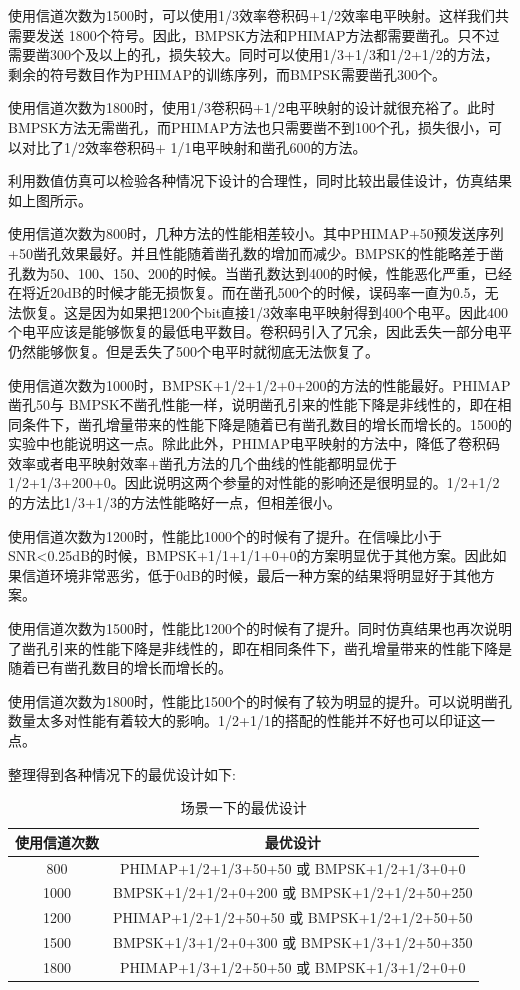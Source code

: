 使用信道次数为1500时，可以使用1/3效率卷积码+1/2效率电平映射。这样我们共需要发送 1800个符号。因此，BMPSK方法和PHIMAP方法都需要凿孔。只不过需要凿300个及以上的孔，损失较大。同时可以使用1/3+1/3和1/2+1/2的方法，剩余的符号数目作为PHIMAP的训练序列，而BMPSK需要凿孔300个。

使用信道次数为1800时，使用1/3卷积码+1/2电平映射的设计就很充裕了。此时BMPSK方法无需凿孔，而PHIMAP方法也只需要凿不到100个孔，损失很小，可以对比了1/2效率卷积码+ 1/1电平映射和凿孔600的方法。

利用数值仿真可以检验各种情况下设计的合理性，同时比较出最佳设计，仿真结果如上图所示。

使用信道次数为800时，几种方法的性能相差较小。其中PHIMAP+50预发送序列+50凿孔效果最好。并且性能随着凿孔数的增加而减少。BMPSK的性能略差于凿孔数为50、100、150、200的时候。当凿孔数达到400的时候，性能恶化严重，已经在将近20dB的时候才能无损恢复。而在凿孔500个的时候，误码率一直为0.5，无法恢复。这是因为如果把1200个bit直接1/3效率电平映射得到400个电平。因此400个电平应该是能够恢复的最低电平数目。卷积码引入了冗余，因此丢失一部分电平仍然能够恢复。但是丢失了500个电平时就彻底无法恢复了。

使用信道次数为1000时，BMPSK+1/2+1/2+0+200的方法的性能最好。PHIMAP凿孔50与 BMPSK不凿孔性能一样，说明凿孔引来的性能下降是非线性的，即在相同条件下，凿孔增量带来的性能下降是随着已有凿孔数目的增长而增长的。1500的实验中也能说明这一点。除此此外，PHIMAP电平映射的方法中，降低了卷积码效率或者电平映射效率+凿孔方法的几个曲线的性能都明显优于1/2+1/3+200+0。因此说明这两个参量的对性能的影响还是很明显的。1/2+1/2的方法比1/3+1/3的方法性能略好一点，但相差很小。

使用信道次数为1200时，性能比1000个的时候有了提升。在信噪比小于SNR<0.25dB的时候，BMPSK+1/1+1/1+0+0的方案明显优于其他方案。因此如果信道环境非常恶劣，低于0dB的时候，最后一种方案的结果将明显好于其他方案。

使用信道次数为1500时，性能比1200个的时候有了提升。同时仿真结果也再次说明了凿孔引来的性能下降是非线性的，即在相同条件下，凿孔增量带来的性能下降是随着已有凿孔数目的增长而增长的。

使用信道次数为1800时，性能比1500个的时候有了较为明显的提升。可以说明凿孔数量太多对性能有着较大的影响。1/2+1/1的搭配的性能并不好也可以印证这一点。

整理得到各种情况下的最优设计如下:

\begin{table}[h]
    \centering
    \small
    \begin{tabular}	{|c|c|}
        \hline
            使用信道次数&最优设计 \\ 
        \hline
            800& PHIMAP+1/2+1/3+50+50 或 BMPSK+1/2+1/3+0+0\\
            1000& BMPSK+1/2+1/2+0+200 或 BMPSK+1/2+1/2+50+250\\
            1200& PHIMAP+1/2+1/2+50+50 或 BMPSK+1/2+1/2+50+50\\
            1500& BMPSK+1/3+1/2+0+300 或 BMPSK+1/3+1/2+50+350\\
            1800& PHIMAP+1/3+1/2+50+50 或 BMPSK+1/3+1/2+0+0\\
        \hline
    \end{tabular}
    \caption{场景一下的最优设计}
\end{table}

